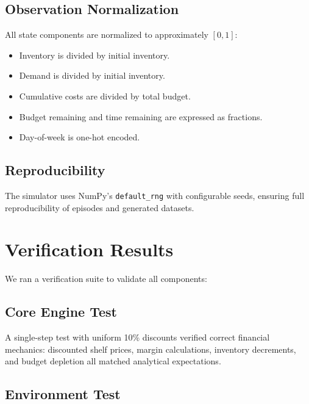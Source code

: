 \documentclass[11pt,a4paper]{article}
\begin{document}
\subsection{Observation Normalization}

All state components are normalized to approximately $[0, 1]$:
\begin{itemize}
    \item Inventory is divided by initial inventory.
    \item Demand is divided by initial inventory.
    \item Cumulative costs are divided by total budget.
    \item Budget remaining and time remaining are expressed as fractions.
    \item Day-of-week is one-hot encoded.
\end{itemize}

\subsection{Reproducibility}

The simulator uses NumPy's \texttt{default\_rng} with configurable seeds, ensuring full reproducibility of episodes and generated datasets.

\section{Verification Results}
\label{sec:verification}

We ran a verification suite to validate all components:

\subsection{Core Engine Test}

A single-step test with uniform 10\% discounts verified correct financial mechanics:
discounted shelf prices, margin calculations, inventory decrements, and budget depletion all matched analytical expectations.

\subsection{Environment Test}
\end{document}
